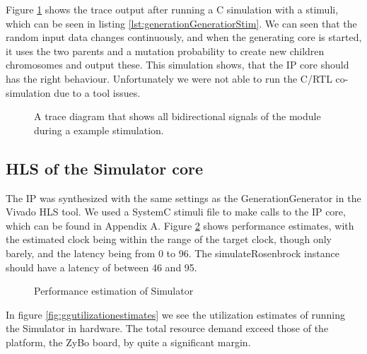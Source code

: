 Figure \ref{fig:generationgeneratortrace} shows the trace output after running a C simulation with a stimuli, which can be seen in listing \ref{lst:generationGeneratiorStim}. We can seen that the random input data changes continuously, and when the generating core is started, it uses the two parents and a mutation probability to create new children chromosomes and output these. This simulation shows, that the IP core should has the right behaviour. Unfortunately we were not able to run the C/RTL co-simulation  due to a tool issues.

\begin{figure}[h!]
	\centering
	\caption{A trace diagram that shows all bidirectional signals of the module during a example stimulation.}
	\label{fig:generationgeneratortrace}
\end{figure}
\FloatBarrier

\subsection{HLS of the Simulator core}

The IP was synthesized with the same settings as the GenerationGenerator in the Vivado HLS tool. We used a SystemC stimuli file to make calls to the IP core, which can be found in Appendix A. Figure \ref{fig:simperformanceestimates} shows performance estimates, with the estimated clock being within the range of the target clock, though only barely, and the latency being from  0 to 96. The simulateRosenbrock instance should have a latency of between 46 and 95. 

\begin{figure}[h!]
	\centering
	\caption{Performance estimation of Simulator}
	\label{fig:simperformanceestimates}
\end{figure}
\FloatBarrier
In figure \ref{fig:ggutilizationestimates} we see the utilization estimates of running the Simulator in hardware. The total resource demand exceed those of the platform, the ZyBo board, by quite a significant margin. 

